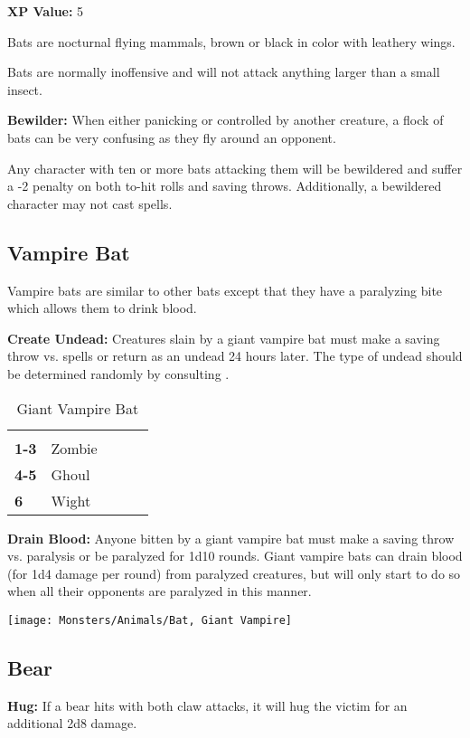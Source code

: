 \begin{multicols*}{2}
{\textbf{XP Value:} 5}

Bats are nocturnal flying mammals, brown or black in color with leathery wings.

Bats are normally inoffensive and will not attack anything larger than a small insect.

\textbf{Bewilder:} When either panicking or controlled by another creature, a flock of bats can be very confusing as they fly around an opponent.

Any character with ten or more bats attacking them will be bewildered and suffer a -2 penalty on both to-hit rolls and saving throws. Additionally, a bewildered character may not cast spells.

\subsection{Vampire Bat}
Vampire bats are similar to other bats except that they have a paralyzing bite which allows them to drink blood.

\textbf{Create Undead:} Creatures slain by a giant vampire bat must make a saving throw vs. spells or return as an undead 24 hours later. The type of undead should be determined randomly by consulting .

\begin {table}[H]
  \caption{Giant Vampire Bat}\label{tab:Giant Vampire Bat}
  \begin{tabularx}{\columnwidth}{>{\bfseries}YYYYY}
	 & \\
	1-3 & Zombie\\
	4-5 & Ghoul\\
	6 & Wight
  \end {tabularx}
\end {table}

\textbf{Drain Blood:} Anyone bitten by a giant vampire bat must make a saving throw vs. paralysis or be paralyzed for 1d10 rounds. Giant vampire bats can drain blood (for 1d4 damage per round) from paralyzed creatures, but will only start to do so when all their opponents are paralyzed in this manner.

\texttt{[image: Monsters/Animals/Bat, Giant Vampire]}

\subsection{Bear}
\textbf{Hug:} If a bear hits with both claw attacks, it will hug the victim for an additional 2d8 damage.


\end{multicols*}
